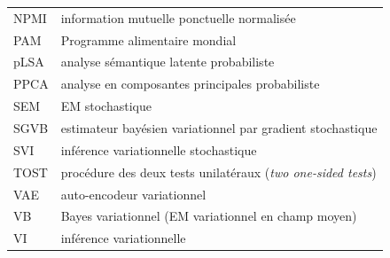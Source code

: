{\begin{tabular}{@{}ll@{}}
NPMI & information mutuelle ponctuelle normalisée \\
PAM & Programme alimentaire mondial \\
pLSA & analyse sémantique latente probabiliste \\
PPCA & analyse en composantes principales probabiliste \\
SEM & EM stochastique \\
SGVB & estimateur bayésien variationnel par gradient stochastique \\
SVI & inférence variationnelle stochastique \\
TOST & procédure des deux tests unilatéraux (\emph{two one-sided tests}) \\
VAE & auto-encodeur variationnel \\
VB & Bayes variationnel (EM variationnel en champ moyen) \\
VI & inférence variationnelle \\
\end{tabular}}
